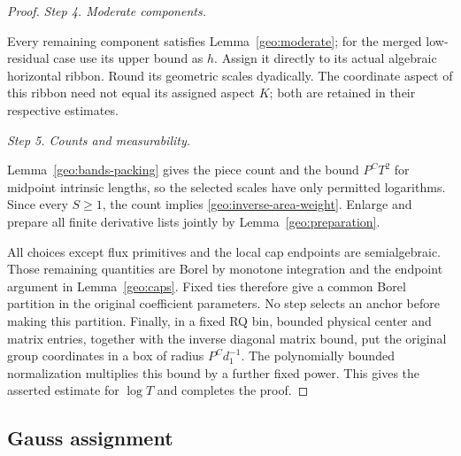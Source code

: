 \documentclass[11pt]{amsart}
\theoremstyle{definition}
\theoremstyle{remark}
\numberwithin{equation}{section}
\begin{document}
\begin{proof}
\par\medskip\noindent\textit{Step 4. Moderate components.}\par\nobreak\smallskip
Every remaining component satisfies Lemma~\ref{geo:moderate}; for the merged low-residual case use its upper bound as $h$. Assign it directly to its actual algebraic horizontal ribbon. Round its geometric scales dyadically. The coordinate aspect of this ribbon need not equal its assigned aspect $K$; both are retained in their respective estimates.

\par\medskip\noindent\textit{Step 5. Counts and measurability.}\par\nobreak\smallskip
Lemma~\ref{geo:bands-packing} gives the piece count and the bound \(P^CT^2\) for midpoint intrinsic lengths, so the selected scales have only permitted logarithms. Since every \(S\ge1\), the count implies \eqref{geo:inverse-area-weight}. Enlarge and prepare all finite derivative lists jointly by Lemma~\ref{geo:preparation}.

All choices except flux primitives and the local cap endpoints are semialgebraic. Those remaining quantities are Borel by monotone integration and the endpoint argument in Lemma~\ref{geo:caps}. Fixed ties therefore give a common Borel partition in the original coefficient parameters. No step selects an anchor before making this partition. Finally, in a fixed RQ bin, bounded physical center and matrix entries, together with the inverse diagonal matrix bound, put the original group coordinates in a box of radius $P^Cd_1^{-1}$. The polynomially bounded normalization multiplies this bound by a further fixed power. This gives the asserted estimate for $\log T$ and completes the proof.
\end{proof}


\subsection{Gauss assignment}\label{geo:gauss-subsection}
\end{document}
